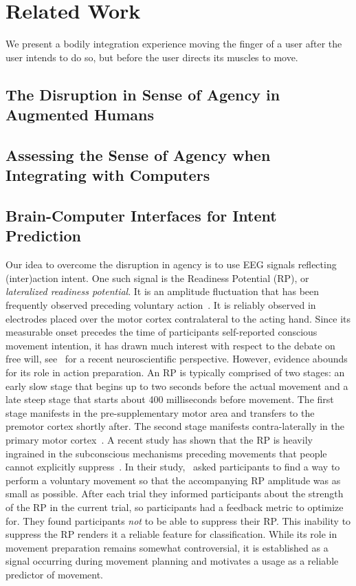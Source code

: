 \section{Related Work}

We present a bodily integration experience moving the finger of a user after the user intends to do so, but before the user directs its muscles to move.

\subsection{The Disruption in Sense of Agency in Augmented Humans}

\subsection{Assessing the Sense of Agency when Integrating with Computers}


\subsection{Brain-Computer Interfaces for Intent Prediction}
Our idea to overcome the disruption in agency is to use EEG signals reflecting (inter)action intent. One such signal is the Readiness Potential (RP), or \textit{lateralized readiness potential}. It is an amplitude fluctuation that has been frequently observed preceding voluntary action~\cite{Deecke1969-bl, Libet1983-qu}. It is reliably observed in electrodes placed over the motor cortex contralateral to the acting hand. Since its measurable onset precedes the time of participants self-reported conscious movement intention, it has drawn much interest with respect to the debate on free will, see~\cite{Schurger2021-vp} for a recent neuroscientific perspective. However, evidence abounds for its role in action preparation. An RP is typically comprised of two stages: an early slow stage that begins up to two seconds before the actual movement and a late steep stage that starts about 400 milliseconds before movement. The first stage manifests in the pre-supplementary motor area and transfers to the premotor cortex shortly after. The second stage manifests contra-laterally in the primary motor cortex~\cite{Shibasaki2006-mt}. A recent study has shown that the RP is heavily ingrained in the subconscious mechanisms preceding movements that people cannot explicitly suppress~\cite{Schultze-Kraft2021-cu}. In their study,~\cite{Schultze-Kraft2021-cu} asked participants to find a way to perform a voluntary movement so that the accompanying RP amplitude was as small as possible. After each trial they informed participants about the strength of the RP in the current trial, so participants had a feedback metric to optimize for. They found participants \textit{not} to be able to suppress their RP. This inability to suppress the RP renders it a reliable feature for classification. While its role in movement preparation remains somewhat controversial, it is established as a signal occurring during movement planning and motivates a usage as a reliable predictor of movement.
